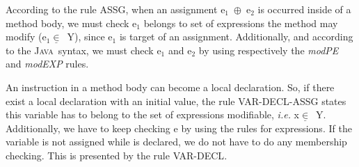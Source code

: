 \documentclass[a4paper]{llncs}
\newcommand{\java}{\textsc{Java}}
\begin{document}
According to the rule
\textup{ASSG}, when an assignment \textup{e}$_1$\ $\oplus$\
\textup{e}$_2$ is occurred inside of a method body, we must check
\textup{e}$_1$ belongs to set of expressions the method may modify
(\textup{e}$_1\underline{\in}$\ \textsc{Y}), since \textup{e}$_1$ is
target of an assignment. Additionally, and according to the
\java~syntax, we must check \textup{e}$_1$ and \textup{e}$_2$ by
using respectively the \textit{modPE} and \textit{modEXP} rules.

An instruction in a method body can become a local declaration. So, if
there exist a local declaration with an initial value, the rule
\textup{VAR-DECL-ASSG} states this variable has to belong to the set
of expressions modifiable, \emph{i.e.} \textup{x}$\underline{\in}$\
\textsc{Y}. Additionally, we have to keep checking \textup{e} by using
the rules for expressions. If the
variable is not assigned while is declared, we do not have to do any
membership checking. This is presented by the rule \textup{VAR-DECL}.
\end{document}
